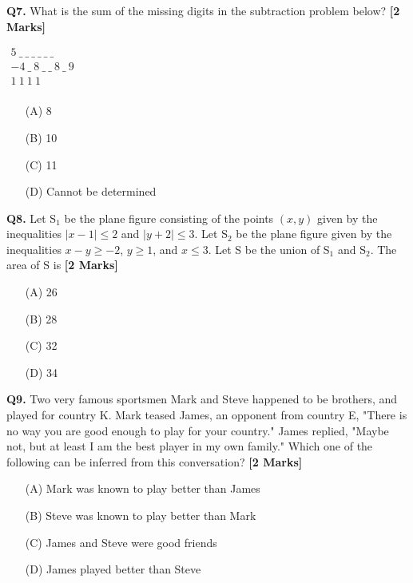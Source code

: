 \documentclass[11pt]{article}
\newcommand{\questionb}[2]{
    \noindent\textbf{Q#2.} #1 \hfill \textbf{[2 Marks]}
}
\begin{document}
\questionb{What is the sum of the missing digits in the subtraction problem below?}{7}
\begin{center}
$\begin{array}{c}
5\ \_\ \_\ \_\ \_\ \_\ \_\ \\
-4\ \_\ 8\ \_\ \_\ 8\ \_\ 9 \\
\hline
1\ 1\ 1\ 1 \\
\end{array}$
\end{center}
\begin{enumerate}
    \item[(A)] 8  
    \item[(B)] 10  
    \item[(C)] 11  
    \item[(D)] Cannot be determined  
\end{enumerate}
\vspace{0.5cm}

\questionb{Let S$_1$ be the plane figure consisting of the points $(x, y)$ given by the inequalities $|x - 1| \leq 2$ and $|y + 2| \leq 3$. Let S$_2$ be the plane figure given by the inequalities $x - y \geq -2$, $y \geq 1$, and $x \leq 3$. Let S be the union of S$_1$ and S$_2$. The area of S is}{8}
\begin{enumerate}
    \item[(A)] 26  
    \item[(B)] 28  
    \item[(C)] 32  
    \item[(D)] 34  
\end{enumerate}
\vspace{0.5cm}

\questionb{Two very famous sportsmen Mark and Steve happened to be brothers, and played for country K. Mark teased James, an opponent from country E, "There is no way you are good enough to play for your country." James replied, "Maybe not, but at least I am the best player in my own family."
Which one of the following can be inferred from this conversation?}{9}
\begin{enumerate}
    \item[(A)] Mark was known to play better than James  
    \item[(B)] Steve was known to play better than Mark  
    \item[(C)] James and Steve were good friends  
    \item[(D)] James played better than Steve  
\end{enumerate}
\vspace{0.5cm}
\end{document}

